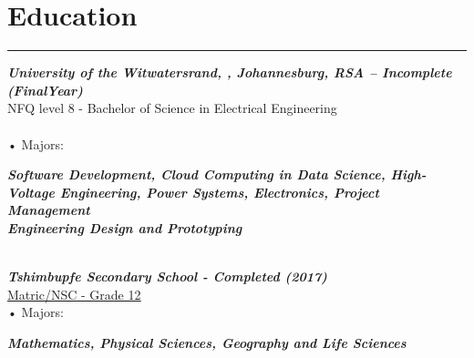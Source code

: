 \documentclass[12pt]{article}
\begin{document}
\vspace{-5mm} \section*{\fontsize{14}{1}\selectfont\color{color_29791}Education}\vspace{-10pt} 
\rule{\textwidth}{0.4pt}
\vspace{2pt}
\textbf{\textit{\fontsize{12}{1}\selectfont\color{color_29791}University of the Witwatersrand, , Johannesburg, RSA – Incomplete (FinalYear)}} %
\\\fontsize{11}{1}\selectfont\color{color_29791}NFQ level 8 - Bachelor of Science in Electrical Engineering\\\\
{{\fontsize{10}{1}\selectfont\color{color_29791}\hspace{10mm}• Majors:}}
\parbox{\textwidth}{\raggedright
    \textbf{\textit{\fontsize{8}{1}\selectfont\color{color_29791}Software Development, Cloud Computing in Data Science, High-Voltage Engineering, Power Systems, Electronics, Project Management \\ Engineering Design and Prototyping}}
} 
\vspace{4pt}
\\\textbf{\textit{\fontsize{12}{1}\selectfont\color{color_29791}Tshimbupfe Secondary School - Completed (2017)}}\\
\fontsize{10}{1}\selectfont\color{color_29791}\href{https://drive.google.com/file/d/1i5SDy8WoBzwGOmAEAcxJzVyCb1c7Gfqq/view?usp=sharing}{\underline{Matric/NSC - Grade 12}}\\
{{\fontsize{10}{1}\selectfont\color{color_29791}\hspace{10mm}• Majors:}}
\parbox{\textwidth}{\raggedright
    \textbf{\textit{\fontsize{9}{1}\selectfont\color{color_29791}Mathematics, Physical Sciences, Geography and Life Sciences}}
}
\end{document}
